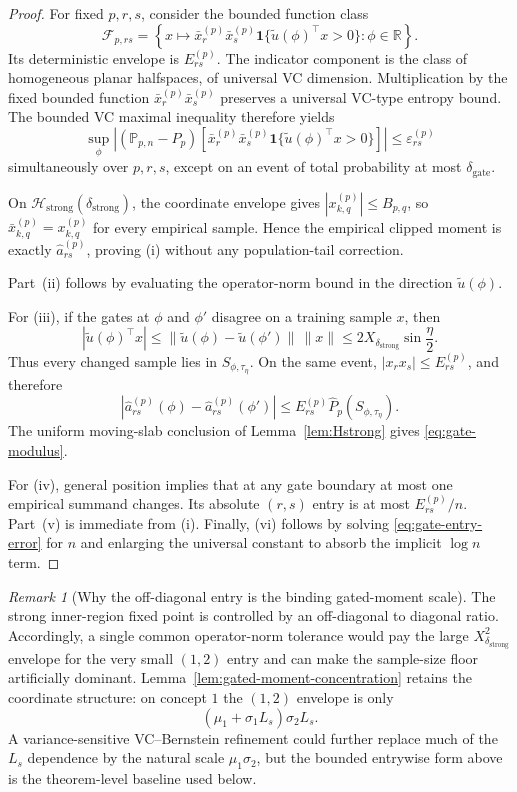 \documentclass{article} %
\theoremstyle{plain}
\theoremstyle{definition}
\theoremstyle{remark}
\newtheorem{remark}[theorem]{Remark}
\begin{document}
\begin{proof}
For fixed $p,r,s$, consider the bounded function class
\[
\mathcal F_{p,rs}
=
\left\{
x\mapsto
\bar x_r^{(p)}\bar x_s^{(p)}
\mathbf 1\{
\widetilde u(\phi)^\top x>0
\}:
\phi\in\mathbb R
\right\}.
\]
Its deterministic envelope is $E_{rs}^{(p)}$.  The indicator component is
the class of homogeneous planar halfspaces, of universal VC dimension.
Multiplication by the fixed bounded function
$\bar x_r^{(p)}\bar x_s^{(p)}$ preserves a universal VC-type entropy bound.
The bounded VC maximal inequality therefore yields
\[
\sup_\phi
\left|
(\mathbb P_{p,n}-P_p)
\left[
\bar x_r^{(p)}\bar x_s^{(p)}
\mathbf 1\{
\widetilde u(\phi)^\top x>0
\}
\right]
\right|
\le
\varepsilon_{rs}^{(p)}
\]
simultaneously over $p,r,s$, except on an event of total probability at
most $\delta_{\mathrm{gate}}$.

On $\mathcal H_{\mathrm{strong}}(\delta_{\mathrm{strong}})$, the coordinate
envelope gives $|x_{k,q}^{(p)}|\le B_{p,q}$, so
$\bar x_{k,q}^{(p)}=x_{k,q}^{(p)}$ for every empirical sample. Hence the
empirical clipped moment is exactly $\widehat a_{rs}^{(p)}$, proving
\textnormal{(i)} without any population-tail correction.

Part~\textnormal{(ii)} follows by evaluating the operator-norm bound in the
direction $\widetilde u(\phi)$.

For \textnormal{(iii)}, if the gates at $\phi$ and $\phi'$ disagree on a
training sample $x$, then
\[
\left|
\widetilde u(\phi)^\top x
\right|
\le
\|\widetilde u(\phi)-\widetilde u(\phi')\|\,\|x\|
\le
2X_{\delta_{\mathrm{strong}}}\sin\frac\eta2.
\]
Thus every changed sample lies in $S_{\phi,\tau_\eta}$.  On the same event,
$|x_rx_s|\le E_{rs}^{(p)}$, and therefore
\[
\left|
\widehat a_{rs}^{(p)}(\phi)
-
\widehat a_{rs}^{(p)}(\phi')
\right|
\le
E_{rs}^{(p)}\widehat P_p(S_{\phi,\tau_\eta}).
\]
The uniform moving-slab conclusion of Lemma~\ref{lem:Hstrong} gives
\eqref{eq:gate-modulus}.

For \textnormal{(iv)}, general position implies that at any gate boundary
at most one empirical summand changes. Its absolute $(r,s)$ entry is at
most $E_{rs}^{(p)}/n$. Part~\textnormal{(v)} is immediate from
\textnormal{(i)}. Finally, \textnormal{(vi)} follows by solving
\eqref{eq:gate-entry-error} for $n$ and enlarging the universal constant to
absorb the implicit $\log n$ term.
\end{proof}

\begin{remark}[Why the off-diagonal entry is the binding gated-moment scale]
The strong inner-region fixed point is controlled by an off-diagonal to
diagonal ratio.  Accordingly, a single common operator-norm tolerance would
pay the large $X_{\delta_{\mathrm{strong}}}^2$ envelope for the very small
$(1,2)$ entry and can make the sample-size floor artificially dominant.
Lemma~\ref{lem:gated-moment-concentration} retains the coordinate structure:
on concept $1$ the $(1,2)$ envelope is only
\[
(\mu_1+\sigma_1L_s)\sigma_2L_s.
\]
A variance-sensitive VC--Bernstein refinement could further replace much of
the $L_s$ dependence by the natural scale $\mu_1\sigma_2$, but the bounded
entrywise form above is the theorem-level baseline used below.
\end{remark}
\end{document}
